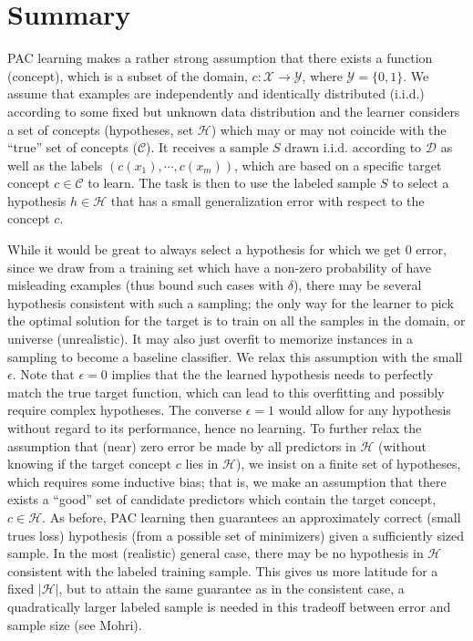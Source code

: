 \section{Summary}
PAC learning makes a rather strong assumption that there exists a function
(concept),
which is a subset of the domain, $c:\mathcal{X} \rightarrow \mathcal{Y}$, where
$\mathcal{Y}=\{0,1\}$.
We assume that examples are independently and identically distributed (i.i.d.)
according to some
fixed but unknown data distribution and the learner considers a set of concepts
(hypotheses, set $\mathcal{H}$)
which may or may not coincide with the ``true'' set of concepts
($\mathcal{C}$).  It receives a sample $S$ drawn i.i.d.
according to $\mathcal{D}$ as well as the labels $(c(x_1), \cdots , c(x_m))$,
which are based on a
specific target concept $c \in \mathcal{C}$ to learn. The task is then to
use the labeled sample $S$
to select a hypothesis $h \in \mathcal{H}$ that has a small generalization
error with respect to the concept $c$.\par
While it would be great to always select a hypothesis for which we get 0
error, since we draw from a training set which have a non-zero probability of
have misleading examples (thus bound such cases with $\delta$),
there may be several hypothesis consistent with such a sampling; the only way
for the learner to
pick the optimal solution for the target is to train on all the samples in the
domain, or universe (unrealistic). It may also just overfit to memorize
instances in a
sampling to become a baseline classifier. We relax this assumption with the
small
$\epsilon$. Note that $\epsilon = 0$
implies that the the learned hypothesis needs to perfectly match the true
target function, which can lead to this overfitting and possibly require
complex
hypotheses. The converse $\epsilon = 1$ would
allow for any hypothesis without regard to its performance, hence no learning.
To
further relax the assumption that (near) zero error be made by all predictors
in
$\mathcal{H}$ (without knowing if the target concept $c$ lies in
$\mathcal{H}$), we insist on a finite set of hypotheses,
which requires some inductive bias; that is, we make an assumption that there
exists a ``good'' set of candidate predictors which contain the target concept,
$c \in \mathcal{H}$. As before, PAC learning then guarantees
an approximately correct (small trues loss) hypothesis (from a possible set of
minimizers) given a sufficiently sized sample.
In the most (realistic) general case, there may be no hypothesis in
$\mathcal{H}$ consistent with the labeled training sample. This
gives us more latitude for a fixed $|\mathcal{H}|$, but to attain the same
guarantee as in the consistent case, a quadratically larger labeled sample is
needed in this tradeoff between error and sample size (see Mohri).\par

